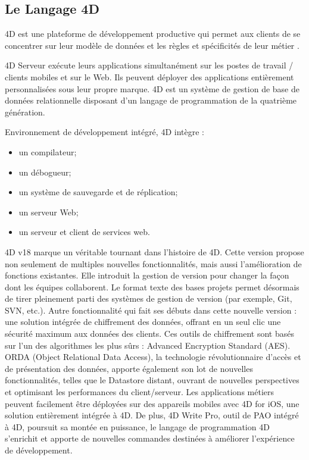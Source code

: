 

\subsection{Le Langage 4D}

4D est une plateforme de développement productive qui permet aux clients
 de se concentrer sur leur modèle de données et les règles 
 et spécificités de leur métier \cite{ref1}.

 4D Serveur exécute leurs applications simultanément sur les postes de travail
/ clients mobiles et sur le Web. Ils peuvent déployer des applications 
entièrement personnalisées sous leur propre marque.
 4D est un système de gestion de base de données 
 relationnelle disposant d’un langage de programmation 
 de la quatrième génération.

Environnement de développement intégré, 4D intègre :
\begin{itemize}
    \item un compilateur;
    \item un débogueur;
    \item un système de sauvegarde et de réplication;
    \item un serveur Web;
    \item un serveur et client de services web.
\end{itemize}


4D v18 marque un véritable tournant dans l’histoire de 4D. Cette version propose non seulement de
multiples nouvelles fonctionnalités, mais aussi l’amélioration de fonctions existantes. Elle introduit la gestion de version pour changer 
la façon dont les équipes collaborent. Le format texte des bases projets permet désormais de tirer pleinement parti des systèmes de gestion de version
(par exemple, Git, SVN, etc.). Autre fonctionnalité qui fait ses débuts dans cette nouvelle version : une solution intégrée de chiffrement des données, 
offrant en un seul clic une sécurité maximum aux données des clients. Ces outils de chiffrement sont basés sur l’un des algorithmes les plus sûrs : 
Advanced Encryption Standard (AES). ORDA (Object Relational Data Access), la technologie révolutionnaire d’accès et de présentation 
des données, apporte également son lot de nouvelles fonctionnalités, telles que le Datastore distant, ouvrant de nouvelles perspectives et optimisant les 
performances du client/serveur. Les applications métiers peuvent facilement être déployées sur des appareils mobiles avec 4D for iOS, une solution 
entièrement intégrée à 4D. De plus, 4D Write Pro, outil de PAO intégré à 4D, poursuit sa montée en puissance, le langage de programmation 4D s’enrichit et apporte de nouvelles commandes destinées à améliorer l’expérience de développement.

